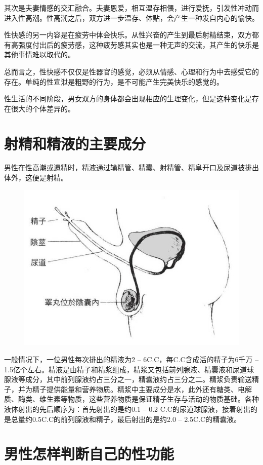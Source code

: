 \documentclass[12pt,UTF8]{ctexbook}
\begin{document}
其次是夫妻情感的交汇融合。夫妻恩爱，相互温存相偎，进行爱抚，引发性冲动而进入性高潮。性高潮之后，双方进一步温存、体贴，会产生一种发自内心的愉快。

性快感的另一内容是在疲劳中体会快乐。从性兴奋的产生到最后射精结束，双方都有高强度付出后的疲劳感，这种疲劳感其实也是一种无声的交流，其产生的快乐是其他事情难以取代的。

总而言之，性快感不仅仅是性器官的感觉，必须从情感、心理和行为中去感受它的存在。单纯的性宣泄是粗野的行为，是不可能产生完美快乐的感觉的。

性生活的不同阶段，男女双方的身体都会出现相应的生理变化，但是这种变化是存在很大的个体差异的。

\section{射精和精液的主要成分}

男性在性高潮或遗精时，精液通过输精管、精囊、射精管、精阜开口及尿道被排出体外，这便是射精。

\begin{figure}[htbp]
	\centering
	\includegraphics[width=0.7\linewidth]{5}
	\caption{}
\end{figure}

一般情况下，一位男性每次排出的精液为2 -- 6C.C，每C.C含成活的精子为6千万 -- 1.5亿个左右。精液是由精子和精浆组成，精浆又包括前列腺液、精囊液和尿道球腺液等成分，其中前列腺液约占三分之一，精囊液约占三分之二。精浆负责输送精子，并为精子提供能量和营养物质。精浆中主要成分是水，此外还有糖类、电解质、酶类、维生素等物质，这些营养物质是保证精子生存与活动的物质基础。各种液体射出的先后顺序为：首先射出的是约0.1 -- 0.2 C.C的尿道球腺液，接着射出的是总量约0.5C.C的前列腺液和精子，最后射出的是约2.0 -- 2.5C.C的精囊液。

\section{男性怎样判断自己的性功能}
\end{document}
